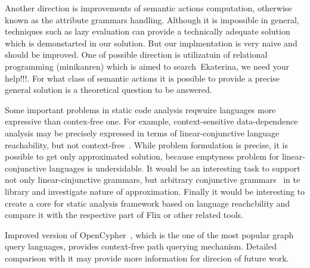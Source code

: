 Another direction is improvements of semantic actions computation, otherwise known as the attribute grammars handling. 
Although it is impossible in general, techniques such as lazy evaluation can provide a technically adequate solution which is demonstarted in our solution.
But our implmentation is very naive and should be improved.
One of possible direction is utilizatuin of relational programming (minikanren) which is aimed to search~\cite{DB}{Ekaterina, we need your help!!!}.
For what class of semantic actions it is possible to provide a precise general solution is a theoretical question to be answered. 

Some important problems in static code analysis reqwuire languages more expressive than contex-free one.
For example, context-sensitive data-dependence analysis may be precisely expressed in terms of linear-conjunctive language~\cite{Okhotin2003LCL} reachability, but not context-free~\cite{LCLReachability}.
While problem formulation is precise, it is possible to get only approximated solution, because emptyness problem for linear-conjunctive languages is undersidable.
It would be an interesting task to support not only linear-cinjunctive grammars, but arbitrary conjunctive grammars~\cite{okhotin2001conjunctive} in te library and investigate nature of approximation.
Finally it would be interesting to create a core for static analysis framework based on language reachcbility and compare it with the respective part of Flix or other related tools.

Improved version of OpenCypher~\cite{OpenCypherPR}, which is the one of the most popular graph query languages, provides context-free path querying mechanism.
Detailed comparison with it may provide more information for direcion of future work.
